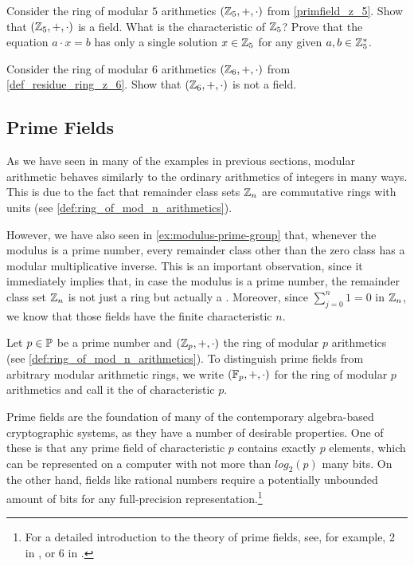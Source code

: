 \begin{exercise}
Consider the ring of modular $5$ arithmetics $(\mathbb{Z}_5,+,\cdot)$ from \examplename{} \ref{primfield_z_5}. Show that $(\mathbb{Z}_5,+,\cdot)$ is a field. What is the characteristic of $\mathbb{Z}_5$? Prove that the equation $a\cdot x = b$ has only a single solution $x\in \mathbb{Z}_5$  for any given $a,b\in \mathbb{Z}_5^*$. 
\end{exercise}
\begin{exercise}
Consider the ring of modular $6$ arithmetics $(\mathbb{Z}_6,+,\cdot)$ from \examplename{} \ref{def_residue_ring_z_6}. Show that $(\mathbb{Z}_6,+,\cdot)$ is not a field.
\end{exercise}

\subsection{Prime Fields}
\label{prime_fields}
As we have seen in many of the examples in previous sections, modular arithmetic behaves similarly to the ordinary arithmetics of integers  in many ways. This is due to the fact that remainder class sets $\mathbb{Z}_n$ are commutative rings with units (see \examplename{} \ref{def:ring_of_mod_n_arithmetics}).

However, we have also seen in \examplename{} \ref{ex:modulus-prime-group} that, whenever the modulus is a prime number, every remainder class other than the zero class has a modular multiplicative inverse. This is an important observation, since it immediately implies that, in case the modulus is a prime number, the remainder class set $\mathbb{Z}_n$ is not just a ring but actually a . Moreover, since $\sum_{j=0}^n 1 = 0$ in $\mathbb{Z}_n$, we know that those fields have the finite characteristic $n$.

\begin{notation}
\label{def:prime_fields}
Let $p \in \mathbb{P}$ be a prime number and $(\mathbb{Z}_p,+,\cdot)$ the ring of modular $p$ arithmetics (see \examplename{} \ref{def:ring_of_mod_n_arithmetics}). To distinguish prime fields from arbitrary modular arithmetic rings, we write  $ (\mathbb{F}_p, +, \cdot) $ for the ring of modular $p$ arithmetics and call it the  of characteristic $p$.
\end{notation}

Prime fields are the foundation of many of the contemporary algebra-based cryptographic systems, as they have a number of desirable properties. One of these is that any prime field of characteristic $p$ contains exactly $p$ elements, which can be represented on a computer with not more than $log_2(p)$ many bits. On the other hand, fields like rational numbers require a potentially unbounded amount of bits for any full-precision representation.\footnote{For a detailed introduction to the theory of prime fields, see, for example, \chaptname{} 2 in \cite{nieder-1986}, or \chaptname{} 6 in \cite{mignotte-1992}.}

